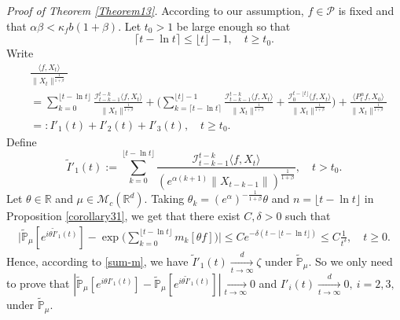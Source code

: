 \documentclass[12pt,a4paper]{amsart}
\theoremstyle{plain}
\theoremstyle{definition}
\numberwithin{equation}{section}
\begin{document}
{\it Proof of Theorem \ref{Theorem13}.}\quad
According to our assumption, $f\in \mathcal P$  is fixed  and  that $\alpha \beta < \kappa_f b(1+\beta)$.
	Let $t_0 > 1$ be large enough so that
\[
	\lceil t - \ln t\rceil
	\leq \lfloor t \rfloor - 1,
	\quad t\geq t_0.
\]
	Write
\begin{align*}
	&\frac{\langle f,X_t\rangle}{\|X_t\|^{\frac{1}{1+\beta}}}
	\\&=\sum_{k=0}^{\lfloor t-\ln t \rfloor} \frac{\mathcal I_{t-k-1}^{t-k}\langle f ,X_t\rangle}{\|X_t\|^{\frac{1}{1+\beta}}}+ \Big(\sum_{k=\lceil t-\ln t \rceil}^{\lfloor t \rfloor-1} \frac{\mathcal I_{t-k-1}^{t-k}\langle f ,X_t\rangle}{\|X_t\|^{\frac{1}{1+\beta}}}+\frac{\mathcal I_0^{t-\lfloor t \rfloor}\langle f ,X_t\rangle}{\|X_t\|^{\frac{1}{1+\beta}}}\Big) +
\frac{\langle P^\alpha_t f, X_0\rangle}{\|X_t\|^{\frac{1}{1+\beta}}}
	\\&=:I'_1(t)+I'_2(t)+I'_3(t),
	\quad t\geq t_0.
\end{align*}
	Define
 \[
 	\tilde I'_1(t)
 	:=\sum_{k=0}^{\lfloor t-\ln t \rfloor}\frac{\mathcal I_{t-k-1}^{t-k}\langle f ,X_t\rangle}{( e^{\alpha(k+1)}\|X_{t-k-1}\|)^{\frac{1}{1+\beta}}},
 	\quad t > t_0.
 \]
    Let $\theta\in \mathbb R$ and $\mu\in \mathcal M_c(\mathbb R^d)$.
    Taking $\theta_k=(e^{\alpha})^{-\frac{1}{1+\beta}} \theta $ and $n={\lfloor t-\ln t \rfloor}$ in Proposition \ref{corollary31},
    we get that there exist $C,\delta > 0$ such that
\begin{align*}
    \Big|\mathbb{\tilde{P}}_{\mu} [e^{i\theta\tilde I'_1(t)} ]-\exp\Big(\sum_{k=0}^{\lfloor t-\ln t \rfloor}m_k[\theta f]\Big)\Big|
    \leq C e^{-\delta(t - \lfloor t - \ln t\rfloor)}
    \leq C \frac{1}{t^{\delta}},
    \quad t\geq 0.
\end{align*}
Hence, according to \eqref{sum-m}, we have $\tilde I'_1(t)\xrightarrow[t\to \infty]{d} \zeta$ under $\tilde {\mathbb P}_\mu$.
   So we only need to prove that $|\mathbb{\tilde{P}}_{\mu}[e^{i\theta I'_1(t)}]-\mathbb{\tilde{P}}_{\mu}[e^{i\theta\tilde I'_1(t)}]|\xrightarrow[t\to \infty]{} 0$ and $I'_i(t)\xrightarrow[t\to \infty]{d} 0,~i=2,3,$ under $\tilde {\mathbb P}_\mu$.
\end{document}
